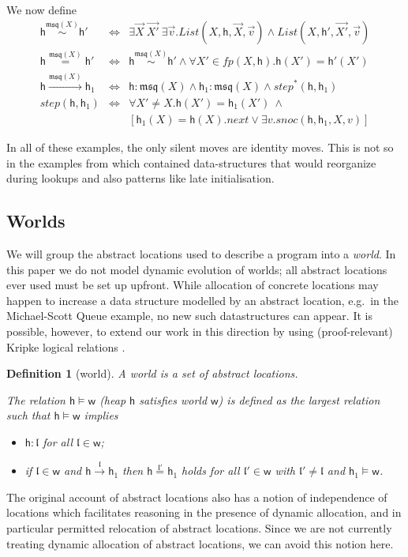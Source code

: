 \documentclass[nocopyrightspace,preprint]{sigplanconf}
\newtheorem{definition}[theorem]{Definition}
\newcommand{\loc}{\mathfrak{l}}
\newcommand{\locMSQ}{\ensuremath{\mathfrak{msq}}\xspace}
\newcommand{\cloc}{\ensuremath{X}\xspace}
\newcommand\w{\ensuremath{\mathsf{w}}\xspace}
\newcommand\heap{\ensuremath{\mathsf{h}}\xspace}
\newcommand\h{\heap}
\newcommand\inR[2]{\ensuremath{#1:#2}}
\newcommand\rloc[3]{\ensuremath{#1 \stackrel{#3}{\sim} #2}}
\newcommand\rrloc[3]{\ensuremath{#1 \stackrel{#3}{=} #2}}
\newcommand\gloc[3]{\ensuremath{#1 \xrightarrow{#3}#2}}
\begin{document}
We now define
\[
 \begin{array}{lcl}
  \rloc{\h}{\h'}{\locMSQ(\cloc)} &\iff&  \exists \vec{X}\ \vec{X'}\ \exists \vec{v}.\textit{List}(\cloc,\h,\vec{X},\vec{v}) \land \textit{List}(\cloc,\h',\vec{X'},\vec{v})\\[1pt]
\rrloc{\h}{\h'}{\locMSQ(\cloc)} &\iff&  \rloc{\h}{\h'}{\locMSQ(\cloc)} \wedge
\forall\cloc'\in\textit{fp}(\cloc,\h).\h(\cloc')=\h'(\cloc')\\[1pt]
\gloc{\h}{\h_1}{\locMSQ(\cloc)} &\iff& \inR{\h}{\locMSQ(\cloc)}\wedge
\inR{\h_1}{\locMSQ(\cloc)}\wedge \textit{step}^*(\h,\h_1)\\[1pt]
\textit{step}(\h,\h_1)&\iff& \forall \cloc'\neq\cloc.\h(\cloc')=\h_1(\cloc')~ \land \\ && [\h_1(\cloc)=\h(\cloc).\textit{next}\vee \exists v.\textit{snoc}(\h,\h_1,\cloc,v)]
\end{array}
\]

In all of these examples, the only silent moves are identity moves.  This is not so in the examples from \cite{DBLP:dblp_conf/popl/Benton0N14} which contained  data-structures that would reorganize during lookups and also patterns like late initialisation. 
\subsection{Worlds}
We will group the abstract locations used to describe a program into a
\emph{world}. In this paper we do not model dynamic evolution of
worlds; all abstract locations ever used must be set up upfront. While
allocation of concrete locations may happen to increase a data structure modelled by
an abstract location, e.g.\ in the Michael-Scott Queue example, no new
such datastructures can appear. It is possible, however, to extend our
work in this direction by using (proof-relevant) Kripke logical
relations
\cite{DBLP:dblp_conf/popl/Benton0N14,DBLP:conf/popl/AhmedDR09}.
\begin{definition}[world]
A \emph{world} is a set of abstract locations. 

The relation $\heap\models \w$ (heap $\h$ satisfies world $\w$) is defined as the largest relation such that $\h\models \w$ implies 
\begin{itemize}
\item \inR{\h}{\loc} for all $\loc\in\w$; 
\item if $\loc\in\w$ and $\gloc{\h}{\h_1}{\loc}$ then 
$\rrloc{\heap}{\heap_1}{\loc'}$ holds for all 
$\loc'\in\w$ with $\loc'\neq\loc$ and $\h_1\models\w$. 
\end{itemize}
\end{definition}
The original account of abstract locations
\cite{DBLP:dblp_conf/popl/Benton0N14} also has a notion of
independence of locations which facilitates reasoning in the presence
of dynamic allocation, and in particular permitted relocation of
abstract locations. Since we are not currently treating dynamic
allocation of abstract locations, we can avoid this notion here.
\end{document}
